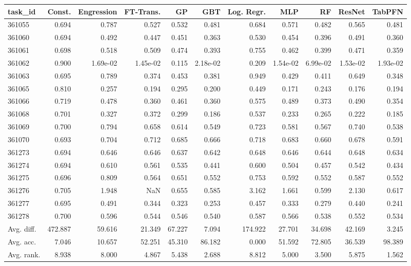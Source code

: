 \begin{tabular}{lrrrrrrrrrr}
\toprule
task\_id & Const. & Engression & FT-Trans. & GP & GBT & Log. Regr. & MLP & RF & ResNet & TabPFN \\
\midrule
361055 & 0.694 & 0.787 & 0.527 & 0.532 & 0.481 & 0.684 & 0.571 & 0.482 & 0.565 & 0.481 \\
361060 & 0.694 & 0.492 & 0.447 & 0.451 & 0.363 & 0.530 & 0.454 & 0.396 & 0.491 & 0.360 \\
361061 & 0.698 & 0.518 & 0.509 & 0.474 & 0.393 & 0.755 & 0.462 & 0.399 & 0.471 & 0.359 \\
361062 & 0.900 & 1.69e-02 & 1.45e-02 & 0.115 & 2.18e-02 & 0.209 & 1.54e-02 & 6.99e-02 & 1.53e-02 & 1.93e-02 \\
361063 & 0.695 & 0.789 & 0.374 & 0.453 & 0.381 & 0.949 & 0.429 & 0.411 & 0.649 & 0.348 \\
361065 & 0.810 & 0.257 & 0.194 & 0.295 & 0.200 & 0.449 & 0.171 & 0.243 & 0.176 & 0.194 \\
361066 & 0.719 & 0.478 & 0.360 & 0.461 & 0.360 & 0.575 & 0.489 & 0.373 & 0.490 & 0.354 \\
361068 & 0.701 & 0.327 & 0.372 & 0.299 & 0.186 & 0.537 & 0.233 & 0.265 & 0.222 & 0.185 \\
361069 & 0.700 & 0.794 & 0.658 & 0.614 & 0.549 & 0.723 & 0.581 & 0.567 & 0.740 & 0.538 \\
361070 & 0.693 & 0.704 & 0.712 & 0.685 & 0.666 & 0.718 & 0.683 & 0.660 & 0.678 & 0.591 \\
361273 & 0.694 & 0.646 & 0.646 & 0.637 & 0.642 & 0.648 & 0.646 & 0.644 & 0.648 & 0.634 \\
361274 & 0.694 & 0.610 & 0.561 & 0.535 & 0.441 & 0.600 & 0.504 & 0.457 & 0.542 & 0.434 \\
361275 & 0.696 & 0.809 & 0.564 & 0.651 & 0.552 & 0.753 & 0.592 & 0.552 & 0.587 & 0.552 \\
361276 & 0.705 & 1.948 & NaN & 0.655 & 0.585 & 3.162 & 1.661 & 0.599 & 2.130 & 0.617 \\
361277 & 0.695 & 0.491 & 0.344 & 0.323 & 0.253 & 0.457 & 0.333 & 0.279 & 0.440 & 0.241 \\
361278 & 0.700 & 0.596 & 0.544 & 0.546 & 0.540 & 0.587 & 0.566 & 0.538 & 0.552 & 0.534 \\
Avg. diff. & 472.887 & 59.616 & 21.349 & 67.227 & 7.094 & 174.922 & 27.701 & 34.698 & 42.169 & 3.245 \\
Avg. acc. & 7.046 & 10.657 & 52.251 & 45.310 & 86.182 & 0.000 & 51.592 & 72.805 & 36.539 & 98.389 \\
Avg. rank. & 8.938 & 8.000 & 4.867 & 5.438 & 2.688 & 8.812 & 5.000 & 3.500 & 5.875 & 1.562 \\
\bottomrule
\end{tabular}
